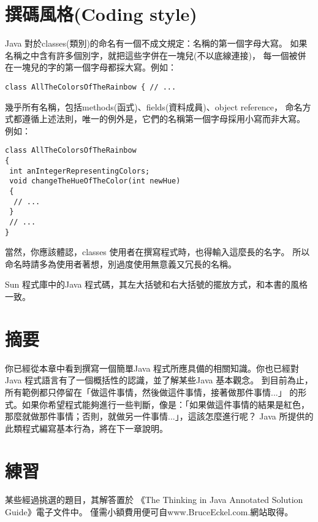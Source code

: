 \section{撰碼風格(Coding style)}
Java 對於classes(類別)的命名有一個不成文規定：名稱的第一個字母大寫。
如果名稱之中含有許多個別字，就把這些字併在一塊兒(不以底線連接)，
每一個被併在一塊兒的字的第一個字母都採大寫。例如：

\begin{Verbatim}[frame=single]
class AllTheColorsOfTheRainbow { // ...
\end{Verbatim}

幾乎所有名稱，包括methods(函式)、fields(資料成員)、object reference，
命名方式都遵循上述法則，唯一的例外是，它們的名稱第一個字母採用小寫而非大寫。
例如：
\begin{Verbatim}[frame=single]
class AllTheColorsOfTheRainbow 
{
 int anIntegerRepresentingColors;
 void changeTheHueOfTheColor(int newHue) 
 {
  // ...
 }
 // ...
}
\end{Verbatim}
當然，你應該體認，classes 使用者在撰寫程式時，也得輸入這麼長的名字。
所以命名時請多為使用者著想，別過度使用無意義又冗長的名稱。

Sun 程式庫中的Java 程式碼，其左大括號和右大括號的擺放方式，和本書的風格一致。
\section{摘要}
你已經從本章中看到撰寫一個簡單Java 程式所應具備的相關知識。你也已經對
Java 程式語言有了一個概括性的認識，並了解某些Java 基本觀念。
到目前為止，所有範例都只停留在「做這件事情，然後做這件事情，接著做那件事情...」
的形式。如果你希望程式能夠進行一些判斷，像是：「如果做這件事情的結果是紅色，
那麼就做那件事情；否則，就做另一件事情...」，這該怎麼進行呢？
Java 所提供的此類程式編寫基本行為，將在下一章說明。
\section{練習}
\footnotesize
某些經過挑選的題目，其解答置於
《The Thinking in Java Annotated Solution Guide》電子文件中。
僅需小額費用便可自www.BruceEckel.com.網站取得。

